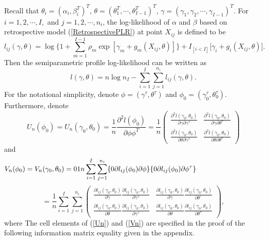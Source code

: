 \documentclass[11pt]{article}
\theoremstyle{plain}
\theoremstyle{definition}
\theoremstyle{remark}
\theoremstyle{definition}
\begin{document}
Recall that $\theta_i=(\alpha_i,\beta_i^T)^T$, $\theta=(\theta_1^T, \cdots, \theta_{I-1}^T)^T$,
$\gamma=(\gamma_1, \gamma_2, \cdots, \gamma_{I-1})^T$. For $i=1, 2, \cdots, I,$ and $j=1, 2, \cdots, n_i$, the
log-likelihood of $\alpha$ and $\beta$ based on retrospective model (\ref{RetrospectivePLR}) at point $X_{ij}$ is defined to be
\begin{equation}
l_{ij}(\gamma, \theta)=\log \{ 1+\sum_{m=1}^{I-1}\rho_m\exp[\gamma_m+g_m(X_{ij},\theta)]
\} +I_{[i<I]}\big[ \gamma_i+g_i(X_{ij},\theta)\big].\label{L_ij}
\end{equation}
Then the semiparametric profile log-likelihood can be written as
$$l(\gamma,\theta)=n\log n_I-\sum_{i=1}^I\sum_{j=1}^{n_i}l_{ij}(\gamma,\theta).$$
For the notational simplicity, denote $\phi=(\gamma^\tau, \theta^\tau)$ and $\phi_0=(\gamma_0^\tau, \theta_0^\tau)$.
Furthermore, denote
\begin{equation}
U_n(\phi_0)=U_n(\gamma_0,
\theta_0)=\frac{1}{n}\frac{\partial^2l(\phi_0)}{\partial \phi\phi^T} =\frac{1}{n} \left( \begin{array}{cc}
\frac{\textstyle{\partial^2 l(\gamma_0, \theta_0)}} {\textstyle{\partial \gamma
\partial \gamma^\tau}}  & \frac{\textstyle{\partial^2 l(\gamma_0, \theta_0)}}
{\textstyle{\partial \gamma \partial \theta^\tau}} \\
\frac{\textstyle{\partial^2 l(\gamma_0, \theta_0)}}{\textstyle{\partial \theta
\partial \gamma^\tau}} & \frac{\textstyle{\partial^2 l(\gamma_0, \theta_0)}}{\textstyle{\partial \theta \partial \theta^\tau}}
\end{array} \right)\label{Un}
\end{equation}
and
$$V_n(\phi_0)=V_n(\gamma_0,\theta_0)=\frac{1}{n}\sum_{i=1}^I\sum_{j=1}^{n_i}
\{\frac{\partial l_{ij}(\phi_0)}{\partial\phi}\} \{\frac{\partial
l_{ij}(\phi_0)}{\partial\phi^\tau} \}\hspace{1.3in} $$
\begin{equation}
= \frac{1}{n} \sum_{i=1}^I\sum_{j=1}^{n_i}\left(
\begin{array}{cc}\frac{\textstyle{\partial l_{ij}(\gamma_0,\theta_0)}}{\textstyle{\partial
\gamma}}\frac{\textstyle{\partial
l_{ij}(\gamma_0,\theta_0)}}{\textstyle{\partial \gamma^\tau}} &
\frac{\textstyle{\partial
l_{ij}(\gamma_0,\theta_0)}}{\textstyle{\partial
\gamma}}\frac{\textstyle{\partial
l_{ij}(\gamma_0,\theta_0)}}{\textstyle{\partial
\theta^\tau}} \\
\frac{\textstyle{\partial
l_{ij}(\gamma_0,\theta_0)}}{\textstyle{\partial
\theta}}\frac{\textstyle{\partial
l_{ij}(\gamma_0,\theta_0)}}{\textstyle{\partial \gamma^\tau}} &
\frac{\textstyle{\partial
l_{ij}(\gamma_0,\theta_0)}}{\textstyle{\partial
\theta}}\frac{\textstyle{\partial
l_{ij}(\gamma_0,\theta_0)}}{\textstyle{\partial \theta^\tau}}
\end{array}\right),\label{Vn}
\end{equation}
\noindent where The cell elements of (\ref{Un}) and (\ref{Vn}) are specified in
the proof of the following information matrix equality given in the appendix.
\end{document}
